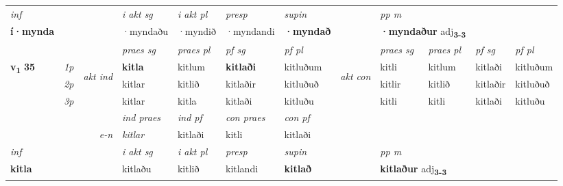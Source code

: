 \begin{longtable}[l]{X>{\footnotesize\itshape}llXXXXlXXXX}
   {\textit{inf}} & &  & \textit{i akt sg} & \textit{i akt pl}   & \textit{presp} & \textit{supin}  && \textit{pp m} \\*
  {\textbf{í\allowbreak ·mynda}} & && ·myndaðu  & ·myndið   & ·myndandi &  \textbf{·myndað}  && \multicolumn{2}{l}{\textbf{·myndaður} adj\textbf{\textsubscript{3-3}}} \\*

\midrule

 & &   & \textit{praes sg}  & \textit{praes pl}    & \textit{ pf sg} & \textit{pf pl} & & \textit{praes sg}  & \textit{praes pl}    & \textit{pf sg} & \textit{pf pl }  \\ \cmidrule{4-7} \cmidrule{9-12}
 \multirow{2}{*}{{{\textbf{v{\textsubscript{1}}} \Large{\textbf{35}}}}}  & 1p & \multirow{3}{*}{\begin{turn}{90}\textit{akt ind}\end{turn}} & \textbf{kitla} & kitlum & \textbf{kitlaði} & kitluðum & \multirow{3}{*}{\begin{turn}{90}\textit{akt con}\end{turn}} &kitli & kitlum & kitlaði & kitluðum\\*
 & 2p &  &  kitlar  & kitlið & kitlaðir & kitluðuð & & kitlir & kitlið & kitlaðir & kitluðuð \\*
 & 3p &  & kitlar & kitla & kitlaði & kitluðu & & kitli & kitli& kitlaði & kitluðu \\*
\cmidrule{4-7} \cmidrule{9-12}

   && &  \textit{ind praes} & \textit{ind pf} & \textit{con praes} & \textit{con pf} \\*
\multicolumn{3}{r}{\textit{e-n}} & kitlar & kitlaði & kitli & kitlaði \\*

\cmidrule{4-7}
   {\textit{inf}} & &  & \textit{i akt sg} & \textit{i akt pl}   & \textit{presp} & \textit{supin}  && \textit{pp m} \\*
  {\textbf{kitla}} & && kitlaðu  & kitlið   & kitlandi &  \textbf{kitlað}  && \multicolumn{2}{l}{\textbf{kitlaður} adj\textbf{\textsubscript{3-3}}} \\*

\midrule


\end{longtable}

